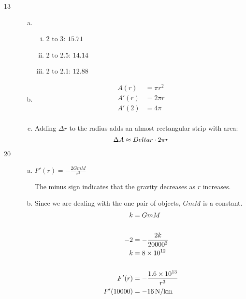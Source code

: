 \documentclass[letterpaper, landscape]{exam}
\begin{document}
\begin{description}
    \item[13]
      \begin{enumerate}[(a)]
        \item 
          \begin{enumerate}[(i)]
            \item 2 to 3: $15.71$
            \item 2 to 2.5: $14.14$
            \item 2 to 2.1: $12.88$
          \end{enumerate}
        \item 
          \begin{align*}
            A(r)  & = \pi r^2 \\
            A'(r) & = 2 \pi r \\
            A'(2) & = 4 \pi \\
          \end{align*}

        \item Adding $\Delta r$ to the radius adds an almost rectangular strip with area:
          \[
            \Delta A \approx Delta r \cdot 2 \pi r \\
          \]
      \end{enumerate}

    \item[20]
      \begin{enumerate}[(a)]
        \item $F'(r) = -\frac{2 G m M}{r^3}$

          The minus sign indicates that the gravity decreases as $r$ increases.

        \item Since we are dealing with the one pair of objects, $GmM$ is a constant.
          \begin{align*}
            k         & = G m M \\
            \\
            -2        & = - \frac{2 k}{20000^3} \\
            k         & = 8 \times 10^{12} \\
            \\
            F'(r)     & = - \frac{1.6 \times 10^{13}}{r^3} \\
            F'(10000) & = \unit[-16]{N/km} \\
          \end{align*}

      \end{enumerate}

  \end{description}
\end{document}
